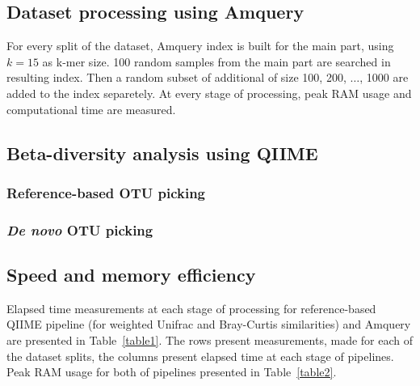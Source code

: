 \documentclass[10pt,letterpaper]{article}
\begin{document}
\subsection*{Dataset processing using Amquery}
For every split of the dataset, Amquery index is built for the main part, using $k=15$ as k-mer size. 100 random samples from the main part are searched in resulting index. 
Then a random subset of additional of size 100, 200, $\dots$, 1000 are added to the index separetely. At every stage of processing, peak RAM usage and computational time are measured.


\subsection*{Beta-diversity analysis using QIIME}
\subsubsection*{Reference-based OTU picking}
\subsubsection*{\textit{De novo} OTU picking}


\subsection*{Speed and memory efficiency}
Elapsed time measurements at each stage of processing for reference-based QIIME pipeline (for weighted Unifrac and Bray-Curtis similarities) and Amquery are presented in Table~\ref{table1}. 
The rows present measurements, made for each of the dataset splits, the columns present elapsed time at each stage of pipelines. 
Peak RAM usage for both of pipelines presented in Table~\ref{table2}.
\end{document}

